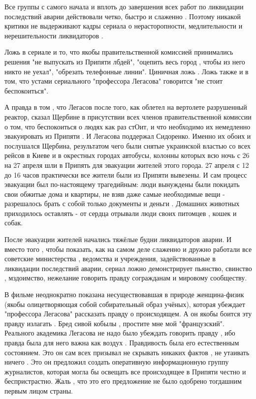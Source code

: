 Все группы с самого начала и вплоть до завершения всех работ по ликвидации
последствий аварии действовали четко, быстро и слаженно . Поэтому никакой
критики не выдерживают кадры сериала о нерасторопности, медлительности и
нерешительности ликвидаторов .

Ложь в сериале и то, что якобы правительственной комиссией принимались решения
"не выпускать из Припяти лбдей", "оцепить весь город , чтобы из него никто не
уехал", "обрезать телефонные линии". Циничная ложь . Ложь также и в том, что
устами сериального  "профессора Легасова" говорится "не стоит беспокоиться". 

А правда в том , что Легасов после того, как облетел на вертолете разрушенный
реактор, сказал Щербине в присутствии всех членов правительственной комиссии о
том, что беспокоиться о людях как раз стОит, и что необходимо их немедленно
эвакуировать  из Припяти . И Легасова поддержал Сидоренко. Именно их обоих и
послушался Щербина, результатом чего были снятые украинской властью со всех
рейсов в Киеве и в окрестных городах автобусы, колонны которых всю ночь с 26 на
27 апреля шли в Припять для эвакуации жителей этого города. 27 апреля с 12 до
16 часов практически все жители были из Припяти вывезены. И сам процесс
эвакуации был по-настоящему трагедийным: люди вынуждены были покидать свои
обжитые дома и квартиры, не взяв даже самые необходимые вещи - разрешалось
брать с собой только документы и деньги . Домашних животных приходилось
оставлять - от сердца отрывали люди своих питомцев , кошек и собак. 

После эвакуации жителей начались тяжёлые будни ликвидаторов аварии. И вместо
того , чтобы показать, как на самом деле слаженно и дружно работали все
советские министерства , ведомства и учреждения, задействованные в ликвидации
последствий аварии, сериал ложно демонстрирует пьянство, свинство , мздоимство,
нежелание говорить правду согражданам и мировому сообществу. 

В фильме неоднократно показана несуществовавшая в природе женщина-физик (якобы
олицетворяющая собой собирательный образ учёных), которая убеждает "профессора
Легасова" рассказать правду о происходящем. А он якобы боится эту правду
излагать . Бред сивой кобылы , простите мне мой "французский". Реального
академика Легасова не надо было убеждать говорить правду , ибо правда была для
него важна как воздух . Правдивость была его естественным состоянием. Это он
сам всех призывал не скрывать никаких фактов , не утаивать ничего . Это он
предложил создать оперативную информационную группу журналистов, которая  могла
бы освещать все происходящее в Припяти честно и беспристрастно. Жаль , что это
его предложение не было одобрено тогдашним первым лицом страны. 


